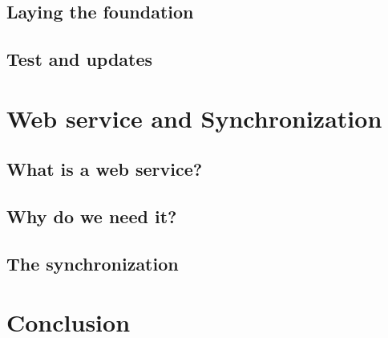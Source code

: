 \documentclass[11pt]{report} %
\begin{document}
\section{Laying the foundation}
%
%
%
%
\section{Test and updates}
%
%
%


%
% 

\chapter{Web service and Synchronization}


\section{What is a web service?}
%
%
\section{Why do we need it?}
%
%
\section{The synchronization}
%
% 

\chapter*{Conclusion}
%
%
%
%



\end{document}
